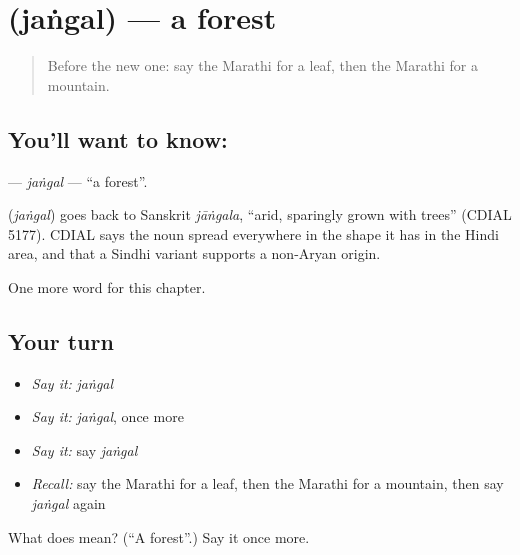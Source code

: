 \section[\texorpdfstring{\mr{जंगल} (jaṅgal)}{जंगल (jaṅgal)}]{ (jaṅgal) — a forest}

\label{lesson:MR-C96-jangal}



\begin{quote}
Before the new one: say the Marathi for a leaf, then the Marathi for a mountain.
\end{quote}

\subsection*{You'll want to know: }
\textbf{} — \emph{jaṅgal} — \textquotedblleft{}a forest\textquotedblright{}.

\begin{cousinweb}
\textbf{} (\emph{jaṅgal}) goes back to Sanskrit \emph{jāṅgala}, \textquotedblleft{}arid, sparingly grown with trees\textquotedblright{} (CDIAL 5177). CDIAL says the noun spread everywhere in the shape it has in the Hindi area, and that a Sindhi variant supports a non-Aryan origin.
\end{cousinweb}

\begin{grammarlens}[title={What you've built}]
One more word for this chapter.
\end{grammarlens}

\subsection*{Your turn}
\begin{itemize}
\raggedright
  \item \emph{Say it:} \emph{jaṅgal}
  \item \emph{Say it:} \emph{jaṅgal}, once more
  \item \emph{Say it:} say \emph{jaṅgal}
  \item \emph{Recall:} say the Marathi for a leaf, then the Marathi for a mountain, then say \emph{jaṅgal} again
\end{itemize}

\begin{tcolorbox}[breakable,colback=teal!4,colframe=teal!35!black,title={Before you move on}]
What does  mean? (\textquotedblleft{}A forest\textquotedblright{}.) Say it once more.
\end{tcolorbox}
